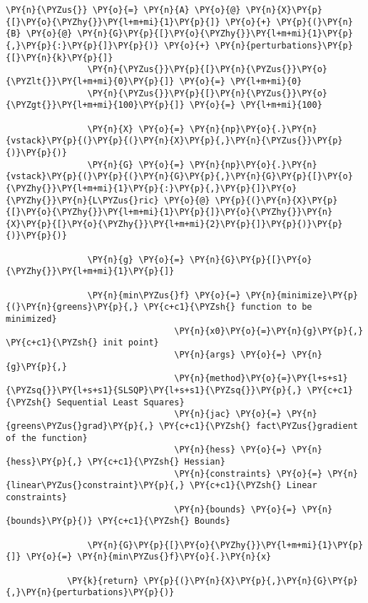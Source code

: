 \begin{Verbatim}[commandchars=\\\{\}]
                \PY{n}{\PYZus{}} \PY{o}{=} \PY{n}{A} \PY{o}{@} \PY{n}{X}\PY{p}{[}\PY{o}{\PYZhy{}}\PY{l+m+mi}{1}\PY{p}{]} \PY{o}{+} \PY{p}{(}\PY{n}{B} \PY{o}{@} \PY{n}{G}\PY{p}{[}\PY{o}{\PYZhy{}}\PY{l+m+mi}{1}\PY{p}{,}\PY{p}{:}\PY{p}{]}\PY{p}{)} \PY{o}{+} \PY{n}{perturbations}\PY{p}{[}\PY{n}{k}\PY{p}{]}
                \PY{n}{\PYZus{}}\PY{p}{[}\PY{n}{\PYZus{}}\PY{o}{\PYZlt{}}\PY{l+m+mi}{0}\PY{p}{]} \PY{o}{=} \PY{l+m+mi}{0}
                \PY{n}{\PYZus{}}\PY{p}{[}\PY{n}{\PYZus{}}\PY{o}{\PYZgt{}}\PY{l+m+mi}{100}\PY{p}{]} \PY{o}{=} \PY{l+m+mi}{100}
        
                \PY{n}{X} \PY{o}{=} \PY{n}{np}\PY{o}{.}\PY{n}{vstack}\PY{p}{(}\PY{p}{(}\PY{n}{X}\PY{p}{,}\PY{n}{\PYZus{}}\PY{p}{)}\PY{p}{)}
                \PY{n}{G} \PY{o}{=} \PY{n}{np}\PY{o}{.}\PY{n}{vstack}\PY{p}{(}\PY{p}{(}\PY{n}{G}\PY{p}{,}\PY{n}{G}\PY{p}{[}\PY{o}{\PYZhy{}}\PY{l+m+mi}{1}\PY{p}{:}\PY{p}{,}\PY{p}{]}\PY{o}{\PYZhy{}}\PY{n}{L\PYZus{}ric} \PY{o}{@} \PY{p}{(}\PY{n}{X}\PY{p}{[}\PY{o}{\PYZhy{}}\PY{l+m+mi}{1}\PY{p}{]}\PY{o}{\PYZhy{}}\PY{n}{X}\PY{p}{[}\PY{o}{\PYZhy{}}\PY{l+m+mi}{2}\PY{p}{]}\PY{p}{)}\PY{p}{)}\PY{p}{)}
                
                \PY{n}{g} \PY{o}{=} \PY{n}{G}\PY{p}{[}\PY{o}{\PYZhy{}}\PY{l+m+mi}{1}\PY{p}{]}
        
                \PY{n}{min\PYZus{}f} \PY{o}{=} \PY{n}{minimize}\PY{p}{(}\PY{n}{greens}\PY{p}{,} \PY{c+c1}{\PYZsh{} function to be minimized}
                                 \PY{n}{x0}\PY{o}{=}\PY{n}{g}\PY{p}{,} \PY{c+c1}{\PYZsh{} init point}
                                 \PY{n}{args} \PY{o}{=} \PY{n}{g}\PY{p}{,}
                                 \PY{n}{method}\PY{o}{=}\PY{l+s+s1}{\PYZsq{}}\PY{l+s+s1}{SLSQP}\PY{l+s+s1}{\PYZsq{}}\PY{p}{,} \PY{c+c1}{\PYZsh{} Sequential Least Squares}
                                 \PY{n}{jac} \PY{o}{=} \PY{n}{greens\PYZus{}grad}\PY{p}{,} \PY{c+c1}{\PYZsh{} fact\PYZus{}gradient of the function}
                                 \PY{n}{hess} \PY{o}{=} \PY{n}{hess}\PY{p}{,} \PY{c+c1}{\PYZsh{} Hessian}
                                 \PY{n}{constraints} \PY{o}{=} \PY{n}{linear\PYZus{}constraint}\PY{p}{,} \PY{c+c1}{\PYZsh{} Linear constraints}
                                 \PY{n}{bounds} \PY{o}{=} \PY{n}{bounds}\PY{p}{)} \PY{c+c1}{\PYZsh{} Bounds}
        
                \PY{n}{G}\PY{p}{[}\PY{o}{\PYZhy{}}\PY{l+m+mi}{1}\PY{p}{]} \PY{o}{=} \PY{n}{min\PYZus{}f}\PY{o}{.}\PY{n}{x}
            
            \PY{k}{return} \PY{p}{(}\PY{n}{X}\PY{p}{,}\PY{n}{G}\PY{p}{,}\PY{n}{perturbations}\PY{p}{)}
        

\end{Verbatim}
